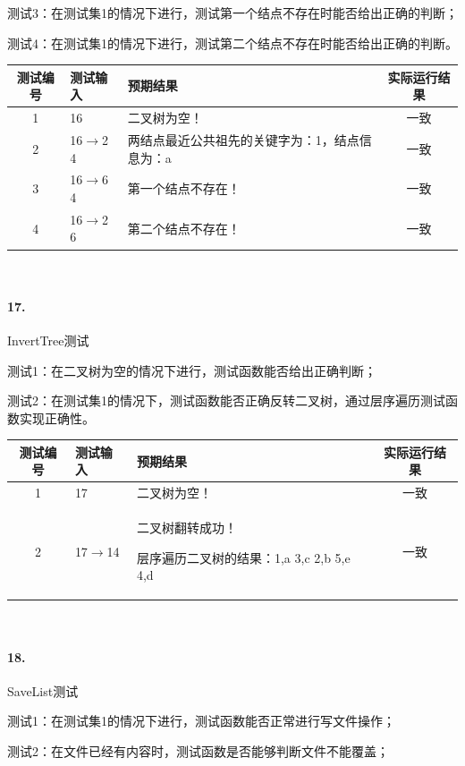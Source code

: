 \documentclass[supercite]{Experimental_Report}
\theoremstyle{definition}
\begin{document}
测试3：在测试集1的情况下进行，测试第一个结点不存在时能否给出正确的判断；

测试4：在测试集1的情况下进行，测试第二个结点不存在时能否给出正确的判断。

\vspace{0.5em}

\begin{tabular}{|c|p{2.7cm}|p{6cm}|c|}
	\hline
	测试编号 & 测试输入 & 预期结果 & 实际运行结果 \\
	\hline
	1 & 16 & 二叉树为空！ & 一致 \\
	\hline
	2 & 16$\rightarrow$2 4 & 两结点最近公共祖先的关键字为：1，结点信息为：a & 一致 \\
	\hline
	3 & 16$\rightarrow$6 4 & 第一个结点不存在！& 一致 \\
	\hline
	4 & 16$\rightarrow$2 6 & 第二个结点不存在！ & 一致 \\
	\hline
\end{tabular}

~\

\paragraph{17.}InvertTree测试

测试1：在二叉树为空的情况下进行，测试函数能否给出正确判断；

测试2：在测试集1的情况下，测试函数能否正确反转二叉树，通过层序遍历测试函数实现正确性。

\vspace{0.5em}

\begin{tabular}{|c|p{2.7cm}|p{6cm}|c|}
	\hline
	测试编号 & 测试输入 & 预期结果 & 实际运行结果 \\
	\hline
	1 & 17 & 二叉树为空！ & 一致 \\
	\hline
	2 & 17$\rightarrow$14 & 二叉树翻转成功！

层序遍历二叉树的结果：1,a 3,c 2,b 5,e 4,d & 一致 \\
	\hline
\end{tabular}

~\

\paragraph{18.}SaveList测试

测试1：在测试集1的情况下进行，测试函数能否正常进行写文件操作；

测试2：在文件已经有内容时，测试函数是否能够判断文件不能覆盖；
\end{document}
